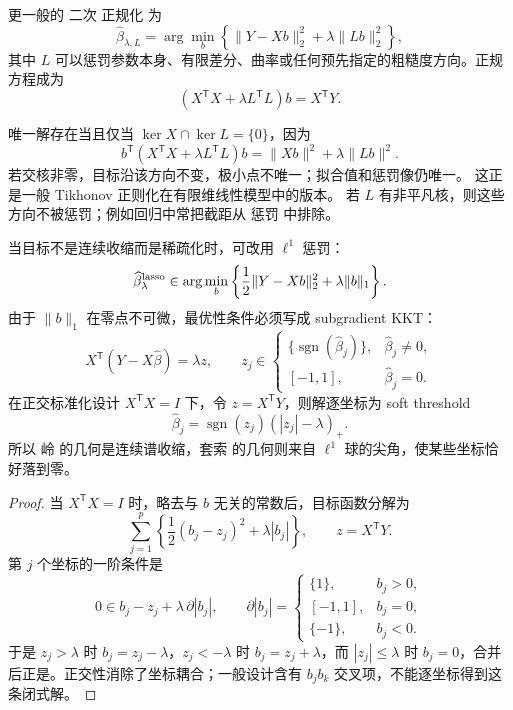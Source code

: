 \begin{definition}[一般二次惩罚]
更一般的 二次 正规化 为
\begin{equation*}\widehat\beta_{\lambda,L}
=\arg\min_b
\left\{
\|Y-Xb\|_2^2+\lambda\|Lb\|_2^2
\right\},\end{equation*}
其中 $L$ 可以惩罚参数本身、有限差分、曲率或任何预先指定的粗糙度方向。正规方程成为
\[
(X^{\mathsf T}X+\lambda L^{\mathsf T}L)b
=X^{\mathsf T}Y.
\]

唯一解存在当且仅当 $\ker X\cap\ker L=\{0\}$，因为
\[
 b^{\mathsf T}(X^{\mathsf T}X+\lambda L^{\mathsf T}L)b
 =\|Xb\|^2+\lambda\|Lb\|^2.
\]
若交核非零，目标沿该方向不变，极小点不唯一；拟合值和惩罚像仍唯一。
这正是一般 Tikhonov 正则化在有限维线性模型中的版本。
若 $L$ 有非平凡核，则这些方向不被惩罚；例如回归中常把截距从 惩罚 中排除。
\end{definition}

\begin{proposition}
当目标不是连续收缩而是稀疏化时，可改用 $\ell^1$ 惩罚：
\begin{equation*}\widehat\beta^{\rm lasso}_\lambda
\in\arg\min_b
\left\{
\frac12\|Y-Xb\|_2^2+\lambda\|b\|_1
\right\}.\end{equation*}
由于 $\|b\|_1$ 在零点不可微，最优性条件必须写成 subgradient KKT：
\begin{equation}
X^{\mathsf T}(Y-X\widehat\beta)
=\lambda z,
\qquad
z_j\in
\begin{cases}
\{\operatorname{sgn}(\widehat\beta_j)\},&\widehat\beta_j\neq0,\\
[-1,1],&\widehat\beta_j=0.
\end{cases}
\label{eq:lasso-kkt}
\end{equation}
在正交标准化设计 $X^{\mathsf T}X=I$ 下，令 $z=X^{\mathsf T}Y$，则解逐坐标为 soft threshold
\begin{equation}
\widehat\beta_j
=\operatorname{sgn}(z_j)(|z_j|-\lambda)_+.
\label{eq:lasso-soft-threshold}
\end{equation}
所以 岭 的几何是连续谱收缩，套索 的几何则来自 $\ell^1$ 球的尖角，使某些坐标恰好落到零。
\end{proposition}

\begin{proof}
当 $X^{\mathsf T}X=I$ 时，略去与 $b$ 无关的常数后，目标函数分解为
\[
 \sum_{j=1}^p
 \left\{\frac12(b_j-z_j)^2+\lambda|b_j|\right\},
 \qquad z=X^{\mathsf T}Y.
\]
第 $j$ 个坐标的一阶条件是
\[
 0\in b_j-z_j+\lambda\,\partial|b_j|,
 \qquad
 \partial|b_j|=
 \begin{cases}
 \{1\},&b_j>0,\\
 [-1,1],&b_j=0,\\
 \{-1\},&b_j<0.
 \end{cases}
\]
于是 $z_j>\lambda$ 时 $b_j=z_j-\lambda$，$z_j<-\lambda$ 时 $b_j=z_j+\lambda$，而 $|z_j|\le\lambda$ 时 $b_j=0$，合并后正是。正交性消除了坐标耦合；一般设计含有 $b_jb_k$ 交叉项，不能逐坐标得到这条闭式解。
\end{proof}

